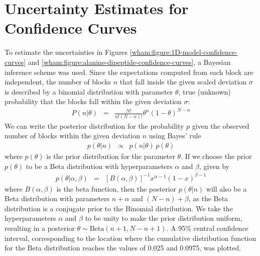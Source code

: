 \section{Uncertainty Estimates for Confidence Curves}
\label{wham:appendix:confidence-uncertainties}

To estimate the uncertainties in Figures \ref{wham:figure:1D-model-confidence-curves} and \ref{wham:figure:alanine-dipeptide-confidence-curves}, a Bayesian inference scheme was used.  Since the expectations computed from each block are independent, the number of blocks $n$ that fall inside the given scaled deviation $\sigma$ is described by a binomial distribution with parameter $\theta$, true (unknown) probability that the blocks fall within the given deviation $\sigma$:
\begin{eqnarray}
P(n | \theta) &=& \frac{N!}{n! (N-n)!} \theta^n (1-\theta)^{N-n}
\end{eqnarray}
We can write the posterior distribution for the probability $p$ given the observed number of blocks within the given deviation $n$ using Bayes' rule
\begin{eqnarray}
p(\theta | n) &\propto& p(n | \theta) \, p(\theta)
\end{eqnarray}
where $p(\theta)$ is the prior distribution for the parameter $\theta$.  If we choose the prior $p(\theta)$ to be a Beta distribution with hyperparameters $\alpha$ and $\beta$, given by
\begin{eqnarray}
p(\theta | \alpha, \beta) &=& [B(\alpha, \beta)]^{-1} x^{\alpha - 1} (1-x)^{\beta-1}
\end{eqnarray}
where $B(\alpha, \beta)$ is the beta function, then the posterior $p(\theta | n)$ will also be a Beta distribution with parameters $n + \alpha$ and $(N-n) + \beta$, as the Beta distribution is a conjugate prior to the Binomial distribution.  We take the hyperparameters $\alpha$ and $\beta$ to be unity to make the prior distribution uniform, resulting in a posterior $\theta \sim \mathrm{Beta}(n+1, N-n+1)$.  A 95\% central confidence interval, corresponding to the location where the cumulative distribution function for the Beta distribution reaches the values of 0.025 and 0.0975, was plotted.

%
%

